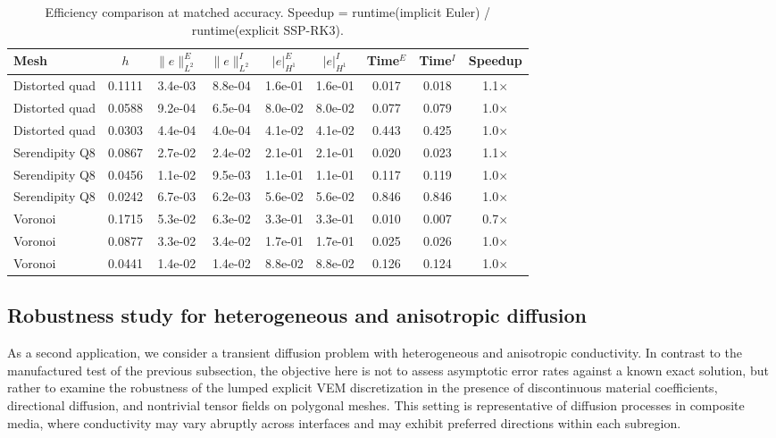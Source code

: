 \documentclass{article}
\begin{document}
    
\begin{table}[H]
    \centering
    \caption{Efficiency comparison at matched accuracy. Speedup = runtime(implicit Euler) / runtime(explicit SSP-RK3).}\label{tab:efficiency}
    \begin{tabular}{l c c c c c c c c}
    \toprule
    Mesh & $h$ & $\|e\|_{L^2}^E$ & $\|e\|_{L^2}^I$ & $|e|_{H^1}^E$ & $|e|_{H^1}^I$ & Time$^E$ & Time$^I$ & Speedup \\
    \midrule
    Distorted quad & 0.1111 & 3.4e-03 & 8.8e-04 & 1.6e-01 & 1.6e-01 & 0.017 & 0.018 & 1.1$\times$ \\
    Distorted quad & 0.0588 & 9.2e-04 & 6.5e-04 & 8.0e-02 & 8.0e-02 & 0.077 & 0.079 & 1.0$\times$ \\
    Distorted quad & 0.0303 & 4.4e-04 & 4.0e-04 & 4.1e-02 & 4.1e-02 & 0.443 & 0.425 & 1.0$\times$ \\
    \addlinespace
    Serendipity Q8 & 0.0867 & 2.7e-02 & 2.4e-02 & 2.1e-01 & 2.1e-01 & 0.020 & 0.023 & 1.1$\times$ \\
    Serendipity Q8 & 0.0456 & 1.1e-02 & 9.5e-03 & 1.1e-01 & 1.1e-01 & 0.117 & 0.119 & 1.0$\times$ \\
    Serendipity Q8 & 0.0242 & 6.7e-03 & 6.2e-03 & 5.6e-02 & 5.6e-02 & 0.846 & 0.846 & 1.0$\times$ \\
    \addlinespace
    Voronoi & 0.1715 & 5.3e-02 & 6.3e-02 & 3.3e-01 & 3.3e-01 & 0.010 & 0.007 & 0.7$\times$ \\
    Voronoi & 0.0877 & 3.3e-02 & 3.4e-02 & 1.7e-01 & 1.7e-01 & 0.025 & 0.026 & 1.0$\times$ \\
    Voronoi & 0.0441 & 1.4e-02 & 1.4e-02 & 8.8e-02 & 8.8e-02 & 0.126 & 0.124 & 1.0$\times$ \\
    \bottomrule
    \end{tabular}
\end{table}

    

\subsection{Robustness study for heterogeneous and anisotropic diffusion}

As a second application, we consider a transient diffusion problem with heterogeneous and anisotropic conductivity. In contrast to the manufactured test of the previous subsection, the objective here is not to assess asymptotic error rates against a known exact solution, but rather to examine the robustness of the lumped explicit VEM discretization in the presence of discontinuous material coefficients, directional diffusion, and nontrivial tensor fields on polygonal meshes. This setting is representative of diffusion processes in composite media, where conductivity may vary abruptly across interfaces and may exhibit preferred directions within each subregion.
\end{document}
